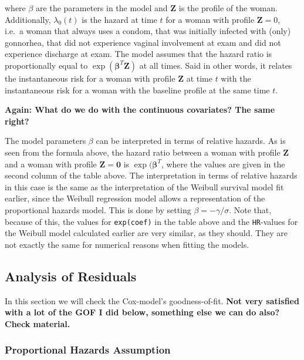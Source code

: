 \documentclass[
]{article}
\begin{document}
where \(\beta\) are the parameters in the model and \(\mathbf{Z}\) is the profile of the woman. Additionally, \(\lambda_0(t)\) is the hazard at time \(t\) for a woman with profile \(\mathbf{Z} = 0\), i.e.~a woman that always uses a condom, that was initially infected with (only) gonnorhea, that did not experience vaginal involvement at exam and did not experience discharge at exam. The model assumes that the hazard ratio is proportionally equal to \(\exp(\mathbf{\beta}^T\mathbf{Z})\) at all times. Said in other words, it relates the instantaneous risk for a woman with profile \(\mathbf{Z}\) at time \(t\) with the instantaneous risk for a woman with the baseline profile at the same time \(t\).

\textbf{Again: What do we do with the continuous covariates? The same right?}

The model parameters \(\beta\) can be interpreted in terms of relative hazards. As is seen from the formula above, the hazard ratio between a woman with profile \(\mathbf{Z}\) and a woman with profile \(\mathbf{Z} = \mathbf{0}\) is \(\exp(\mathbf{\beta}^T\), where the values are given in the second column of the table above. The interpretation in terms of relative hazards in this case is the same as the interpretation of the Weibull survival model fit earlier, since the Weibull regression model allows a representation of the proportional hazards model. This is done by setting \(\beta = -\gamma/\sigma\). Note that, because of this, the values for \texttt{exp(coef)} in the table above and the \texttt{HR}-values for the Weibull model calculated earlier are very similar, as they should. They are not exactly the same for numerical reasons when fitting the models.

\hypertarget{analysis-of-residuals}{%
\subsection{Analysis of Residuals}\label{analysis-of-residuals}}

In this section we will check the Cox-model's goodness-of-fit. \textbf{Not very satisfied with a lot of the GOF I did below, something else we can do also? Check material.}

\hypertarget{proportional-hazards-assumption}{%
\subsubsection{Proportional Hazards Assumption}\label{proportional-hazards-assumption}}
\end{document}
